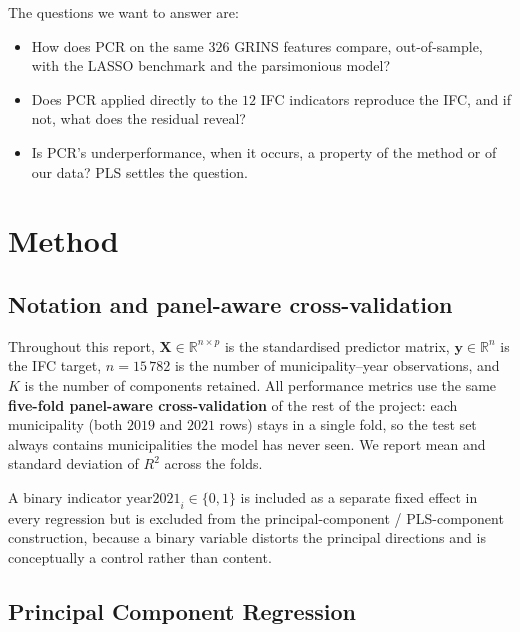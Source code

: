 \documentclass[11pt,a4paper]{article}
\begin{document}
The questions we want to answer are:
\begin{itemize}[leftmargin=2em]
  \item How does PCR on the same \(326\) GRINS features compare,
    out-of-sample, with the LASSO benchmark and the parsimonious
    model?
  \item Does PCR applied directly to the \(12\) IFC indicators
    reproduce the IFC, and if not, what does the residual reveal?
  \item Is PCR's underperformance, when it occurs, a property of
    the method or of our data? PLS settles the question.
\end{itemize}

\section{Method}

\subsection{Notation and panel-aware cross-validation}

Throughout this report, \(\mathbf{X}\in\mathbb{R}^{n\times p}\) is
the standardised predictor matrix, \(\mathbf{y}\in\mathbb{R}^{n}\)
is the IFC target, \(n = 15\,782\) is the number of
municipality--year observations, and \(K\) is the number of
components retained. All performance metrics use the same
\textbf{five-fold panel-aware cross-validation} of the rest of the
project: each municipality (both \(2019\) and \(2021\) rows) stays
in a single fold, so the test set always contains municipalities
the model has never seen. We report mean and standard deviation of
\(R^{2}\) across the folds.

A binary indicator \(\mathrm{year2021}_i\in\{0,1\}\) is included
as a separate fixed effect in every regression but is excluded from
the principal-component / PLS-component construction, because a
binary variable distorts the principal directions and is
conceptually a control rather than content.

\subsection{Principal Component Regression}
\end{document}
